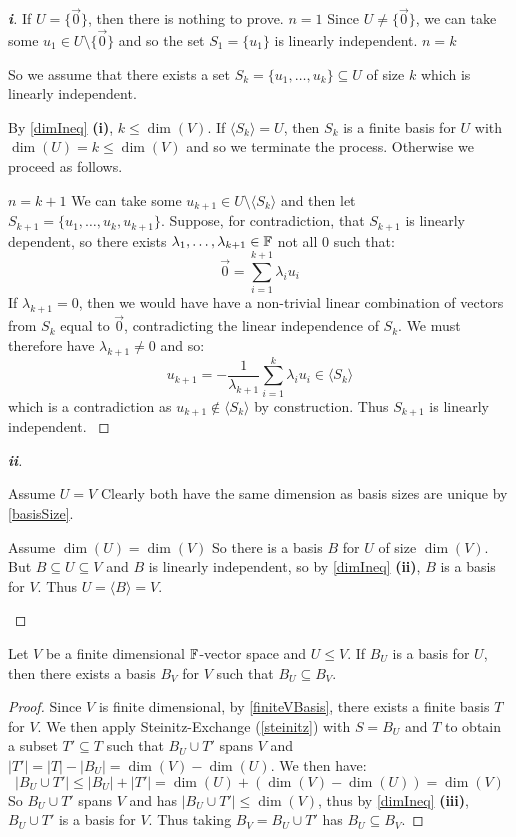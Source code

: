 \documentclass[../main.tex]{subfiles}
\begin{document}
\begin{proof}[\textbf{i}]
  If $U = \{\vec{0}\}$, then there is nothing to prove.
  \quietinduction
  {$n = 1$}{
    Since $U \neq \{\vec{0}\}$, we can take some $u_1 \in U \setminus \{\vec{0}\}$ and so the set $S_1 = \{u_1\}$ is linearly independent.
  }
  {$n = k$}{
    So we assume that there exists a set $S_k = \{u_1, \ldots, u_k\} \subseteq U$ of size $k$ which is linearly independent.

    By \cref{dimIneq} \textbf{(i)}, $k \leq \dim(V)$.
    If $\langle S_k \rangle = U$, then $S_k$ is a finite basis for $U$ with $\dim(U) = k \leq \dim(V)$ and so we terminate the process.
    Otherwise we proceed as follows.
  }
  {$n = k + 1$}{
    We can take some $u_{k + 1} \in U \setminus \langle S_k \rangle$ and then let $S_{k + 1} = \{u_1, \ldots, u_k, u_{k+ 1}\}$.
    Suppose, for contradiction, that $S_{k + 1}$ is linearly dependent, so there exists $\lambda_1, \ldots, \lambda_{k + 1} \in \mathbb{F}$ not all 0 such that:
    \[
      \vec{0} = \sum_{i = 1}^{k + 1} \lambda_i u_i
    \]
    If $\lambda_{k + 1} = 0$, then we would have have a non-trivial linear combination of vectors from $S_k$ equal to $\vec{0}$, contradicting the linear independence  of $S_k$.
    We must therefore have $\lambda_{k + 1} \neq 0$ and so:
    \[
      u_{k + 1} = - \frac{1}{\lambda_{k + 1}} \sum_{i = 1}^{k} \lambda_i u_i \in \langle S_k \rangle
    \]
    which is a contradiction as $u_{k + 1} \notin \langle S_k \rangle$ by construction.
    Thus $S_{k + 1}$ is linearly independent.
  }
\end{proof}
\begin{proof}[\textbf{ii}]
  \begin{proofdirection}{Assume $U = V$}
    Clearly both have the same dimension as basis sizes are unique by \cref{basisSize}.
  \end{proofdirection}
  \begin{proofdirection}{Assume $\dim(U) = \dim(V)$}
    So there is a basis $B$ for $U$ of size $\dim(V)$.
    But $B \subseteq U \subseteq V$ and $B$ is linearly independent, so by \cref{dimIneq} \textbf{(ii)}, $B$ is a basis for $V$.
    Thus $U = \langle B \rangle = V$.
  \end{proofdirection}
\end{proof}
\begin{proposition}
  Let $V$ be a finite dimensional $\mathbb{F}$-vector space and $U \leq V$.
  If $B_U$ is a basis for $U$, then there exists a basis $B_V$ for $V$ such that $B_U \subseteq B_V$. \label{basisExtension}
\end{proposition}
\begin{proof}
  Since $V$ is finite dimensional, by \cref{finiteVBasis}, there exists a finite basis $T$ for $V$.
  We then apply Steinitz-Exchange (\cref{steinitz}) with $S = B_U$ and $T$ to obtain a subset $T' \subseteq T$ such that $B_U \cup T'$ spans $V$ and $|T'| = |T| - |B_U| = \dim(V) - \dim(U)$.
  We then have:
  \[
    |B_U \cup T'| \leq |B_U| + |T'| = \dim(U) + (\dim(V) - \dim(U)) = \dim(V)
  \]
  So $B_U \cup T'$ spans $V$ and has $|B_U \cup T'| \leq \dim(V)$, thus by \cref{dimIneq} \textbf{(iii)}, $B_U \cup T'$ is a basis for $V$.
  Thus taking $B_V = B_U \cup T'$ has $B_U \subseteq B_V$.
\end{proof}
\end{document}
